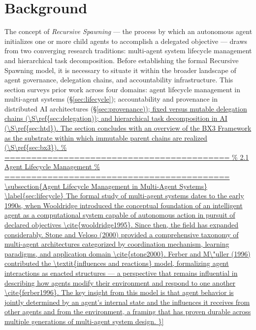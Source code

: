 \section{Background}
\label{sec:background}

The concept of \textit{Recursive Spawning} — the process by which an autonomous agent initializes one or more child agents to accomplish a delegated objective — draws from two converging research traditions: multi-agent system lifecycle management and hierarchical task decomposition. Before establishing the formal Recursive Spawning model, it is necessary to situate it within the broader landscape of agent governance, delegation chains, and accountability infrastructure. This section surveys prior work across four domains: agent lifecycle management in multi-agent systems (\S\ref{sec:lifecycle}); accountability and provenance in distributed AI architectures (\S\ref{sec:provenance)); fixed versus mutable delegation chains (\S\ref{sec:delegation)); and hierarchical task decomposition in AI (\S\ref{sec:htd}). The section concludes with an overview of the BX3 Framework as the substrate within which immutable parent chains are realized (\S\ref{sec:bx3}).

\subsection{Agent Lifecycle Management in Multi-Agent Systems}
\label{sec:lifecycle}

The formal study of multi-agent systems dates to the early 1990s, when Wooldridge introduced the conceptual foundation of an intelligent agent as a computational system capable of autonomous action in pursuit of declared objectives \cite{wooldridge1995}. Since then, the field has expanded considerably. Stone and Veloso (2000) provided a comprehensive taxonomy of multi-agent architectures categorized by coordination mechanism, learning paradigms, and application domain \cite{stone2000}. Ferber and M\"uller (1996) contributed the \textit{influences and reactions} model, formalizing agent interactions as enacted structures — a perspective that remains influential in describing how agents modify their environment and respond to one another \cite{ferber1996}. The key insight from this model is that agent behavior is jointly determined by an agent's internal state and the influences it receives from other agents and from the environment, a framing that has proven durable across multiple generations of multi-agent system design.

}}

